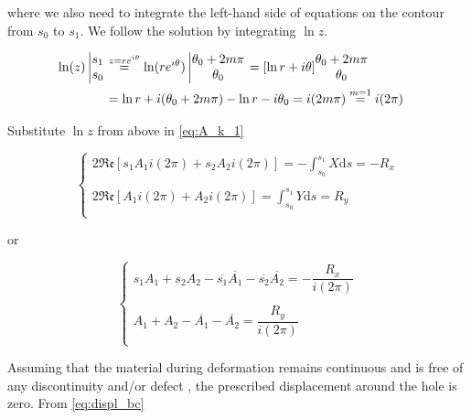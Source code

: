 \documentclass{article}
\begin{document}
where we also need to integrate the left-hand side of equations on the contour from $s_0$ to $s_1$. We follow the solution by integrating $\ln z$.

\begin{align}
    \ln (z) \left|\begin{matrix} s_1\\  s_0  \end{matrix}\right. & \overset{z=r e^{i \theta}}{=} \ln (r e^{i \theta}) \left|\begin{matrix} \theta_0 + 2m\pi \\ \theta_0 \end{matrix}\right. = [\ln r + i\theta] \begin{matrix} \theta_0 + 2m\pi \\ \theta_0 \end{matrix}  & \notag \\
      & = \ln r + i(\theta_0 + 2m\pi) - \ln r - i\theta_0 = i(2m\pi) \overset{m=1}{=} i(2\pi)
    \label{eq:multi_A_k}
\end{align}

Substitute $\ln z$ from above in \cref{eq:A_k_1}

\begin{equation*}
\left\{\begin{matrix}
    2 \mathfrak{Re}[s_1 A_1 i(2\pi) + s_2 A_2 i(2\pi) ] = -\displaystyle\int_{s_0}^{s_1}{X} \mathrm{d}s = -R_x\\
    \\
    2 \mathfrak{Re}[A_1 i(2\pi) + A_2 i(2\pi)] = \displaystyle\int_{s_0}^{s_1}{Y}\mathrm{d}s = R_y\\ 
\end{matrix}\right.
\end{equation*}

or

\begin{equation}
\left\{\begin{matrix}
    s_1 A_1 + s_2 A_2 - \overline{s_1} \overline{A_1} - \overline{s_2} \overline{A_2} = -\dfrac{R_x}{i(2\pi)}\\
    \\
    A_1 + A_2 - \overline{A_1} - \overline{A_2} = \dfrac{R_y}{i(2\pi)}\\ 
\end{matrix}\right.
    \label{eq:A_k_2}
\end{equation}

Assuming that the material during deformation remains continuous and is free of any discontinuity and/or defect \cite{Koussios2009}, the prescribed displacement around the hole is zero. From \cref{eq:displ_bc}
\end{document}
